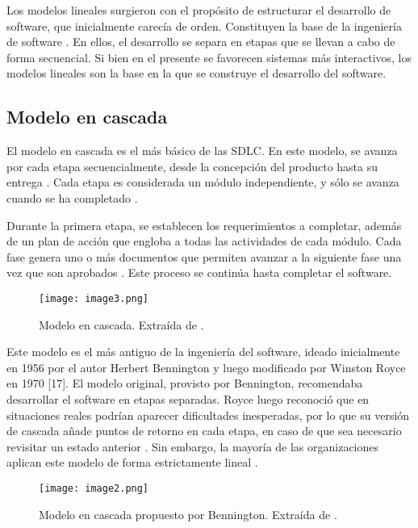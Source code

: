 Los modelos lineales surgieron con el propósito de estructurar el desarrollo de software, que inicialmente carecía de orden. Constituyen la base de la ingeniería de software \cite{pressmanIngenieriaSoftwareEnfoque2013}. En ellos, el desarrollo se separa en etapas que se llevan a cabo de forma secuencial. Si bien en el presente se favorecen sistemas más interactivos, los modelos lineales son la base en la que se construye el desarrollo del software.
%
%
\subsection{Modelo en cascada}
\par El modelo en cascada es el más básico de las SDLC. En este modelo, se avanza por cada etapa secuencialmente, desde la concepción del producto hasta su entrega \cite{pressmanIngenieriaSoftwareEnfoque2013,sStudySoftwareDevelopment2017,dwivediComparativeStudyVarious2022}. Cada etapa es considerada un módulo independiente, y sólo se avanza cuando se ha completado \cite{dwivediComparativeStudyVarious2022}.
\par Durante la primera etapa, se establecen los requerimientos a completar, además de un plan de acción que engloba a todas las actividades de cada módulo. Cada fase genera uno o más documentos que permiten avanzar a la siguiente fase una vez que son aprobados \cite{sommervilleIngenieriaSoftware9a2011}. Este proceso se continúa hasta completar el software.
%
\begin{figure}[h]
  \centering
  \texttt{[image: image3.png]}
  \caption{Modelo en cascada. Extraída de \cite{pressmanIngenieriaSoftwareEnfoque2013}.}
  \label{fig:x Modelo en cascada}
\end{figure}
%
\par Este modelo es el más antiguo de la ingeniería del software, ideado inicialmente en 1956 por el autor Herbert Bennington y luego modificado por Winston Royce en 1970 [17].
El modelo original, provisto por Bennington, recomendaba desarrollar el software en etapas separadas. Royce luego reconoció que en situaciones reales podrían aparecer dificultades inesperadas, por lo que su versión de cascada añade puntos de retorno en cada etapa, en caso de que sea necesario revisitar un estado anterior \cite{rupareliaSoftwareDevelopmentLifecycle2010,royceManagingDevelopmentLarge1970}. Sin embargo, la mayoría de las organizaciones aplican este modelo de forma estrictamente lineal \cite{pressmanIngenieriaSoftwareEnfoque2013}.
\begin{figure}[h]
  \centering
  \texttt{[image: image2.png]}
  \caption{Modelo en cascada propuesto por Bennington. Extraída de \cite{rupareliaSoftwareDevelopmentLifecycle2010}.}
  \label{fig:x Modelo en cascada propuesto por Bennington}
\end{figure}
